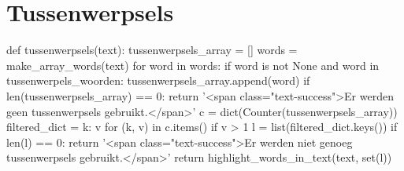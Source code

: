 \section{Tussenwerpsels}
\label{bijlage:tussenwerpsels}
\begin{python}
def tussenwerpsels(text):
    tussenwerpsels_array = []
    words = make_array_words(text)
    for word in words:
        if word is not None and word in tussenwerpels_woorden:
            tussenwerpsels_array.append(word)
    if len(tussenwerpsels_array) == 0:
        return '<span class="text-success">Er werden geen tussenwerpsels gebruikt.</span>'
    c = dict(Counter(tussenwerpsels_array))
    filtered_dict = {k: v for (k, v) in c.items() if v > 1}
    l = list(filtered_dict.keys())
    if len(l) == 0:
        return '<span class="text-success">Er werden niet genoeg tussenwerpsels gebruikt.</span>'
    return highlight_words_in_text(text, set(l))
\end{python}

